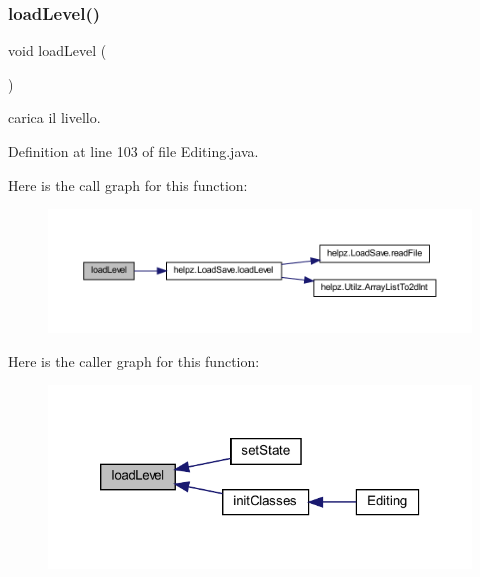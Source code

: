 \subsubsection{\texorpdfstring{load\+Level()}{loadLevel()}}
{\footnotesize\ttfamily void load\+Level (\begin{DoxyParamCaption}{ }\end{DoxyParamCaption})}



carica il livello. 



Definition at line 103 of file Editing.\+java.

Here is the call graph for this function\+:\nopagebreak
\begin{figure}[H]
\begin{center}
\leavevmode
\includegraphics[width=350pt]{classscenes_1_1_editing_a286931cc46e197f4a85af7229fdc29a4_cgraph}
\end{center}
\end{figure}
Here is the caller graph for this function\+:\nopagebreak
\begin{figure}[H]
\begin{center}
\leavevmode
\includegraphics[width=320pt]{classscenes_1_1_editing_a286931cc46e197f4a85af7229fdc29a4_icgraph}
\end{center}
\end{figure}
\mbox{\label{classscenes_1_1_editing_a45d56bd84238e8b56589dfc732e2b2cf}} 
